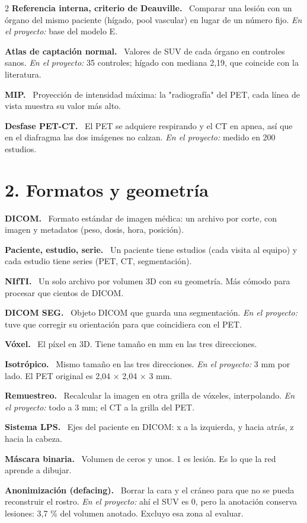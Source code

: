 \documentclass[9pt,a4paper]{extarticle}
\newcommand{\T}[1]{{\sffamily\bfseries\color{tinta}#1.}\ }
\newcommand{\aqui}[1]{{\color{acento}\itshape En el proyecto:} #1}
\begin{document}
\begin{multicols}{2}
\T{Referencia interna, criterio de Deauville} Comparar una lesión con un órgano del mismo paciente (hígado, pool vascular) en lugar de un número fijo. \aqui{base del modelo E.}

\T{Atlas de captación normal} Valores de SUV de cada órgano en controles sanos. \aqui{35 controles; hígado con mediana 2,19, que coincide con la literatura.}

\T{MIP} Proyección de intensidad máxima: la "radiografía" del PET, cada línea de vista muestra su valor más alto.

\T{Desfase PET-CT} El PET se adquiere respirando y el CT en apnea, así que en el diafragma las dos imágenes no calzan. \aqui{medido en 200 estudios.}

\section{2. Formatos y geometría}

\T{DICOM} Formato estándar de imagen médica: un archivo por corte, con imagen y metadatos (peso, dosis, hora, posición).

\T{Paciente, estudio, serie} Un paciente tiene estudios (cada visita al equipo) y cada estudio tiene series (PET, CT, segmentación).

\T{NIfTI} Un solo archivo por volumen 3D con su geometría. Más cómodo para procesar que cientos de DICOM.

\T{DICOM SEG} Objeto DICOM que guarda una segmentación. \aqui{tuve que corregir su orientación para que coincidiera con el PET.}

\T{Vóxel} El píxel en 3D. Tiene tamaño en mm en las tres direcciones.

\T{Isotrópico} Mismo tamaño en las tres direcciones. \aqui{3 mm por lado. El PET original es 2,04 × 2,04 × 3 mm.}

\T{Remuestreo} Recalcular la imagen en otra grilla de vóxeles, interpolando. \aqui{todo a 3 mm; el CT a la grilla del PET.}

\T{Sistema LPS} Ejes del paciente en DICOM: x a la izquierda, y hacia atrás, z hacia la cabeza.

\T{Máscara binaria} Volumen de ceros y unos. 1 es lesión. Es lo que la red aprende a dibujar.

\T{Anonimización (defacing)} Borrar la cara y el cráneo para que no se pueda reconstruir el rostro. \aqui{ahí el SUV es 0, pero la anotación conserva lesiones: 3,7 \% del volumen anotado. Excluyo esa zona al evaluar.}


\end{multicols}
\end{document}
